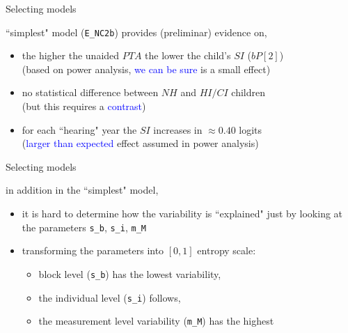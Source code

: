 %
%
\begin{lhframe}[rhgraphic={\texttt{[image: select\_model1.png]}}]
	{Selecting models}
	
	``simplest" model (\texttt{E\_NC2b}) provides (preliminar) evidence on,
	\begin{itemize}
		\item the higher the unaided $PTA$ the lower the child's $SI$ ($bP[2]$)\\
		{\small (based on power analysis, \textcolor{blue}{we can be sure} is a small effect) }
		\item no statistical difference between $NH$ and $HI/CI$ children \\
		{\small (but this requires a \textcolor{blue}{contrast}) }
		\item for each ``hearing" year the $SI$ increases in $\approx 0.40$ logits \\
		{\small (\textcolor{blue}{larger than expected} effect assumed in power analysis) }
	\end{itemize}
\end{lhframe}
%
%
\begin{lhframe}[rhgraphic={\texttt{[image: variability\_plot.pdf]}}]
	{Selecting models}
	
	in addition in the ``simplest" model,
	\begin{itemize}
		\item it is hard to determine how the variability is ``explained" just by looking at the parameters \texttt{s\_b}, \texttt{s\_i}, \texttt{m\_M}
		\item transforming the parameters into $[0,1]$ entropy scale:
		\begin{itemize}
			\item block level (\texttt{s\_b}) has the lowest variability,
			\item the individual level (\texttt{s\_i}) follows,
			\item the measurement level variability (\texttt{m\_M}) has the highest
		\end{itemize}
	\end{itemize}
\end{lhframe}
%
%

